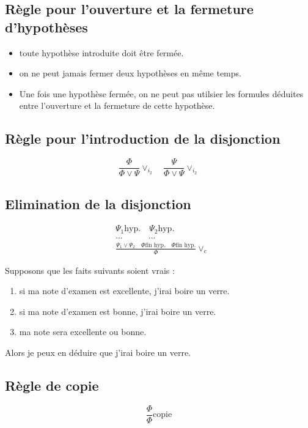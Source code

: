 \subsection{Règle pour l'ouverture et la fermeture d'hypothèses}
\begin{itemize}[label=$\bullet$]
\item toute hypothèse introduite doit être fermée.
\item on ne peut jamais fermer deux hypothèses en même temps.
\item Une fois une hypothèse fermée, on ne peut pas utilsier les formules déduites entre l'ouverture et la fermeture de cette hypothèse.
\end{itemize}


\subsection{Règle pour l'introduction de la disjonction}
\begin{equation*}
\frac{\Phi}{\Phi\lor\Psi}\lor_{i_2}\quad\frac{\Psi}{\Phi\lor\Psi}\lor_{i_2}
\end{equation*}

\subsection{Elimination de la disjonction}
\begin{align*}
    &\Psi_1 \text{hyp.} \quad \Psi_2 \text{hyp.} \\
    &...\quad\quad\quad ...\\
    &\frac{\Psi_1\lor\Psi_2\quad\Phi\text{fin hyp.}\quad\Phi\text{fin hyp.}}{\Phi}\lor_e
\end{align*}
\begin{example}
    Supposons que les faits suivants soient vrais : 
    \begin{enumerate}
        \item si ma note d'examen est excellente, j'irai boire un verre.
        \item si ma note d'examen est bonne, j'irai boire un verre.
        \item ma note sera excellente ou bonne.
    \end{enumerate}
    Alors je peux en déduire que j'irai boire un verre.
\end{example}

\subsection{Règle de copie}
\begin{equation*}
\frac{\Phi}{\Phi}\text{copie}
\end{equation*}

